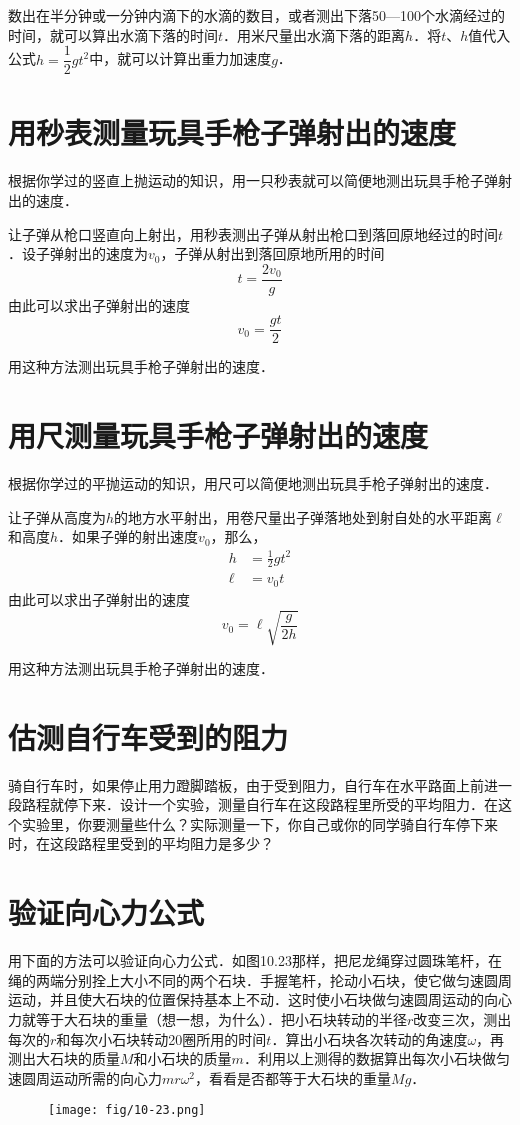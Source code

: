 数出在半分钟或一分钟内滴下的水滴的数目，或者测出下落50—100个水滴经过的时间，就可以算出水滴下落的时间$t$．用米尺量出水滴下落的距离$h$．将$t$、$h$值代入公式$h=\dfrac{1}{2}gt^2$中，就可以计算出重力加速度$g$．

\section{用秒表测量玩具手枪子弹射出的速度}
根据你学过的竖直上抛运动的知识，用一只秒表就可以简便地测出玩具手枪子弹射出的速度．

让子弹从枪口竖直向上射出，用秒表测出子弹从射出枪口到落回原地经过的时间$t$．设子弹射出的速度为$v_0$，子弹从射出到落回原地所用的时间
\[t=\frac{2v_0}{g}\]
由此可以求出子弹射出的速度
\[v_0=\frac{gt}{2}\]

用这种方法测出玩具手枪子弹射出的速度．

\section{用尺测量玩具手枪子弹射出的速度}
根据你学过的平抛运动的知识，用尺可以简便地测出玩具手枪子弹射出的速度．

让子弹从高度为$h$的地方水平射出，用卷尺量出子弹落地处到射自处的水平距离$\ell$和高度$h$．如果子弹的射出速度$v_0$，那么，
\[\begin{split}
    h&=\frac{1}{2}gt^2\\
    \ell&=v_0t
\end{split}\]
由此可以求出子弹射出的速度
\[v_0=\ell \sqrt{\frac{g}{2h}}\]

用这种方法测出玩具手枪子弹射出的速度．

\section{估测自行车受到的阻力}

骑自行车时，如果停止用力蹬脚踏板，由于受到阻力，自行车在水平路面上前进一段路程就停下来．设计一个实验，测量自行车在这段路程里所受的平均阻力．在这个实验里，你要测量些什么？实际测量一下，你自己或你的同学骑自行车停下来时，在这段路程里受到的平均阻力是多少？

\section{验证向心力公式}
用下面的方法可以验证向心力公式．如图10.23那样，把尼龙绳穿过圆珠笔杆，在绳的两端分别拴上大小不同的两个石块．手握笔杆，抡动小石块，使它做匀速圆周运动，并且使大石块的位置保持基本上不动．这时使小石块做匀速圆周运动的向心力就等于大石块的重量（想一想，为什么）．把小石块转动的半径$r$改变三次，测出每次的$r$和每次小石块转动20圈所用的时间$t$．算出小石块各次转动的角速度$\omega$，再测出大石块的质量$M$和小石块的质量$m$．利用以上测得的数据算出每次小石块做匀速圆周运动所需的向心力$mr\omega^2$，看看是否都等于大石块的重量$Mg$．
\begin{figure}[htp]\centering
    \texttt{[image: fig/10-23.png]}
    \caption{}
    \end{figure}


